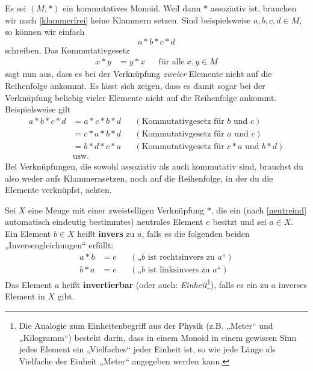 \begin{bem}
    Es sei $(M,*)$ ein kommutatives Monoid. Weil dann $*$ assoziativ ist, brauchen wir nach \cref{klammerfrei} keine Klammern setzen. Sind beispielsweise $a,b,c,d\in M$, so können wir einfach
        \[ a*b*c*d \]
    schreiben. Das Kommutativgesetz
    \begin{align*}
        x*y&=y*x && \text{für alle}\ x,y\in M
    \end{align*}
    sagt nun aus, dass es bei der Verknüpfung \emph{zweier} Elemente nicht auf die Reihenfolge ankommt. Es lässt sich zeigen, dass es damit sogar bei der Verknüpfung beliebig vieler Elemente nicht auf die Reihenfolge ankommt. Beispielsweise gilt
    \begin{align*}
        a*b*c*d & = a*c*b*d && (\text{Kommutativgesetz für $b$ und $c$}) \\
        & = c*a*b*d && (\text{Kommutativgesetz für $a$ und $c$}) \\
        & = b*d*c*a && (\text{Kommutativgesetz für $c*a$ und $b*d$}) \\
        & \text{usw.}
    \end{align*}
    Bei Verknüpfungen, die sowohl assoziativ als auch kommutativ sind, brauchst du also weder aufs Klammernsetzen, noch auf die Reihenfolge, in der du die Elemente verknüpfst, achten.
\end{bem}


\begin{de} \label{def:inverse}  
    Sei $X$ eine Menge mit einer zweistelligen Verknüpfung $*$, die ein (nach \cref{neutreind} automatisch eindeutig bestimmtes) neutrales Element $e$ besitzt und sei $a\in X$. Ein Element $b\in X$ heißt \textbf{invers} zu $a$, falls es die folgenden beiden „Inversengleichungen“ erfüllt:
    \begin{align*}
        a*b & = e && (\text{„$b$ ist rechtsinvers zu $a$“}) \\
        b*a & = e && (\text{„$b$ ist linksinvers zu $a$“})
    \end{align*}
    Das Element $a$ heißt \textbf{invertierbar} (oder auch: \emph{Einheit}\footnote{Die Analogie zum Einheitenbegriff aus der Physik (z.B. „Meter“ und „Kilogramm“) besteht darin, dass in einem Monoid in einem gewissen Sinn jedes Element ein „Vielfaches“ jeder Einheit ist, so wie jede Länge als Vielfache der Einheit „Meter“ angegeben werden kann.}), falls es ein zu $a$ inverses Element in $X$ gibt.
\end{de}


